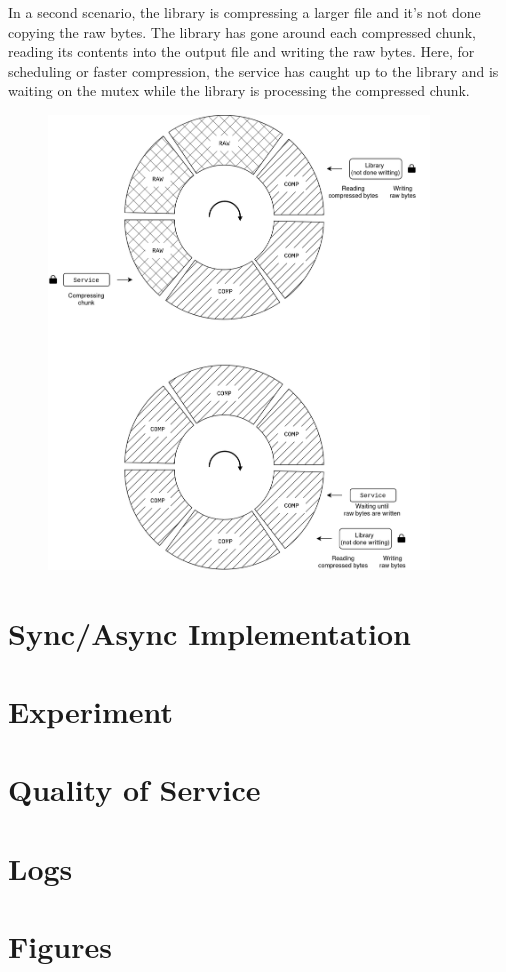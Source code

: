\documentclass[12pt]{article}
\begin{document}
\newpage
\par In a second scenario, the library is compressing a larger file and it's not done copying the raw bytes.
The library has gone around each compressed chunk, reading its contents into the output file and writing the raw bytes.
Here, for scheduling or faster compression, the service has caught up to the library and is waiting on the mutex while the library is processing the compressed chunk.
\begin{figure}[h]
\centering
\includegraphics[width=0.9\textwidth]{AOS-not-done.png}
\end{figure}
\FloatBarrier


\section*{Sync/Async Implementation}



\section*{Experiment}



\section*{Quality of Service}



\section*{Logs}



\section*{Figures}
\end{document}
